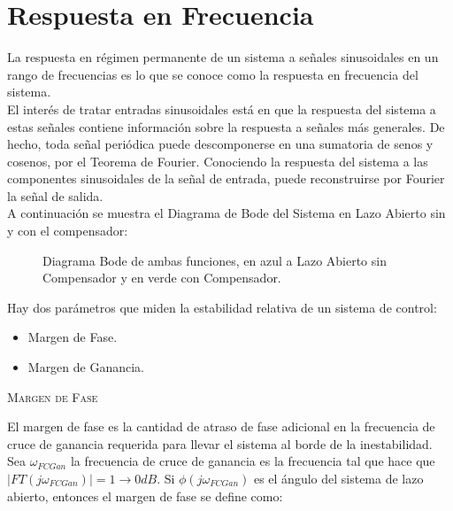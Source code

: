 \documentclass[a4paper,11pt]{article}
\begin{document}
\section{Respuesta en Frecuencia}
\sloppy
La respuesta en régimen permanente de un sistema a señales sinusoidales en un rango de frecuencias es lo que se conoce como la respuesta en frecuencia del sistema.\\
El interés de tratar entradas sinusoidales está en que la respuesta del sistema a estas señales contiene información sobre la respuesta a señales más generales. De hecho, toda señal periódica puede descomponerse en una sumatoria de senos y cosenos, por el Teorema de Fourier. Conociendo la respuesta del sistema a las componentes sinusoidales de la señal de entrada, puede reconstruirse por Fourier la señal de salida.\\
A continuación se muestra el Diagrama de Bode del Sistema en Lazo Abierto sin y con el compensador:\\

	\begin{figure}[H] %
	\caption{Diagrama Bode de ambas funciones, en azul a Lazo Abierto sin Compensador
	y en verde con Compensador.}
	\label{fig:bode_la+la_comp}
	\end{figure}
	
Hay dos parámetros que miden la estabilidad relativa de un sistema de control:
\begin{itemize}
\item Margen de Fase.
\item Margen de Ganancia.
\end{itemize}

\textsc{Margen de Fase}

El margen de fase es la cantidad de atraso de fase adicional en la frecuencia de cruce de ganancia requerida para llevar el sistema al borde de la inestabilidad.\\
Sea $\omega_{FCGan}$ la frecuencia de cruce de ganancia es la frecuencia tal que hace que $|FT(j\omega_{FCGan})|=1\rightarrow 0dB$. Si $\phi(j\omega_{FCGan})$ es el ángulo del sistema de lazo abierto, entonces el margen de fase se define como:
\end{document}
